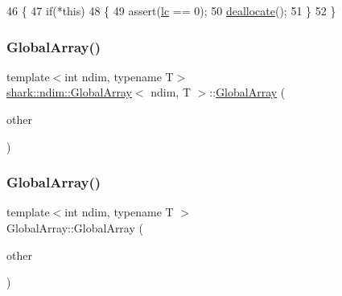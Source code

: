 \begin{DoxyCode}
46 \{
47     \textcolor{keywordflow}{if}(*\textcolor{keyword}{this})
48     \{
49         assert(\hyperlink{classshark_1_1ndim_1_1_global_array_a8248f4bd6e1f48d25148dd6d5288cb4c}{lc} == 0);
50         \hyperlink{classshark_1_1ndim_1_1_global_array_a62353dca76c53cee5fb9cfa5f31cd542}{deallocate}();
51     \}
52 \}
\end{DoxyCode}
\hypertarget{classshark_1_1ndim_1_1_global_array_ac2140f54377695ea7d2898ebfe69fee9}{}\label{classshark_1_1ndim_1_1_global_array_ac2140f54377695ea7d2898ebfe69fee9} 
\subsubsection{\texorpdfstring{Global\+Array()}{GlobalArray()}\hspace{0.1cm}{\footnotesize\ttfamily [4/5]}}
{\footnotesize\ttfamily template$<$int ndim, typename T$>$ \\
\hyperlink{classshark_1_1ndim_1_1_global_array}{shark\+::ndim\+::\+Global\+Array}$<$ ndim, T $>$\+::\hyperlink{classshark_1_1ndim_1_1_global_array}{Global\+Array} (\begin{DoxyParamCaption}\item[{const \hyperlink{classshark_1_1ndim_1_1_global_array}{Global\+Array}$<$ ndim, T $>$ \&}]{other }\end{DoxyParamCaption})\hspace{0.3cm}{\ttfamily [delete]}}

\hypertarget{classshark_1_1ndim_1_1_global_array_a963ccb19d6e77904259a7ca500cfb514}{}\label{classshark_1_1ndim_1_1_global_array_a963ccb19d6e77904259a7ca500cfb514} 
\subsubsection{\texorpdfstring{Global\+Array()}{GlobalArray()}\hspace{0.1cm}{\footnotesize\ttfamily [5/5]}}
{\footnotesize\ttfamily template$<$int ndim, typename T $>$ \\
Global\+Array\+::\+Global\+Array (\begin{DoxyParamCaption}\item[{\hyperlink{classshark_1_1ndim_1_1_global_array}{Global\+Array}$<$ ndim, T $>$ \&\&}]{other }\end{DoxyParamCaption})}



